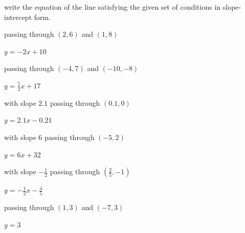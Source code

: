 
write the equation of the line satisfying the given set of conditions in slope-intercept form.

\begin{exercise}\label{exercise-2.2.1}
passing through $(2,6)$ and $(1,8)$
\end{exercise}

\begin{solution}
    $y=-2x+10$
\end{solution}



\begin{exercise}
passing through $(-4,7)$ and $(-10,-8)$
\end{exercise}

\begin{solution}
    $y=\frac{5}{2}x+17$
\end{solution}



\begin{exercise}
with slope $2.1$ passing through $(0.1,0)$
\end{exercise}

\begin{solution}
    $y=2.1x-0.21$
\end{solution}



\begin{exercise}
with slope $6$ passing through $(-5,2)$
\end{exercise}

\begin{solution}
    $y=6x+32$
\end{solution}



\begin{exercise}
with slope $-\frac{1}{2}$ passing through $(\frac{2}{5},-1)$
\end{exercise}

\begin{solution}
    $y=-\frac{1}{2}x-\frac{4}{5}$
\end{solution}



\begin{exercise}
passing through $(1,3)$ and $(-7,3)$
\end{exercise}

\begin{solution}
$y=3$
\end{solution}



